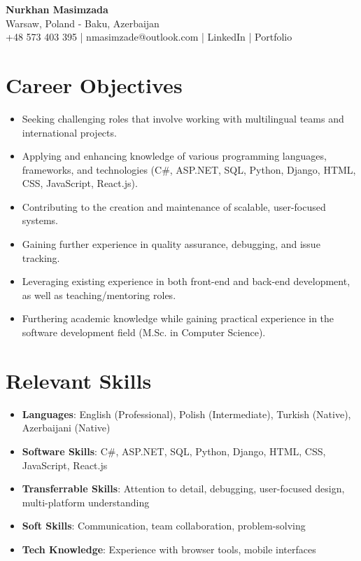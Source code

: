 \documentclass[11pt,a4paper]{article}
\begin{document}
\begin{center}
    {\Large \textbf{Nurkhan Masimzada}} \\
     Warsaw, Poland - Baku, Azerbaijan \\
    +48 573 403 395 | nmasimzade@outlook.com | LinkedIn | Portfolio
\end{center}

\section*{Career Objectives}
\begin{itemize}[leftmargin=*]
 
    \item Seeking challenging roles that involve working with multilingual teams and international projects.
    \item Applying and enhancing knowledge of various programming languages, frameworks, and technologies (C\#, ASP.NET, SQL, Python, Django, HTML, CSS, JavaScript, React.js).
    \item Contributing to the creation and maintenance of scalable, user-focused systems.
    \item Gaining further experience in quality assurance, debugging, and issue tracking.
    \item Leveraging existing experience in both front-end and back-end development, as well as teaching/mentoring roles.
    \item Furthering academic knowledge while gaining practical experience in the software development field (M.Sc. in Computer Science).
\end{itemize}

\section*{Relevant Skills}
\begin{itemize}[leftmargin=*]
    \item \textbf{Languages}: English (Professional), Polish (Intermediate), Turkish (Native),  Azerbaijani (Native)
    \item \textbf{Software Skills}: C\#, ASP.NET, SQL, Python, Django, HTML, CSS, JavaScript, React.js
    \item \textbf{Transferrable Skills}: Attention to detail, debugging, user-focused design, multi-platform understanding
    \item \textbf{Soft Skills}: Communication, team collaboration, problem-solving
    \item \textbf{Tech Knowledge}: Experience with browser tools, mobile interfaces
\end{itemize}
\end{document}
